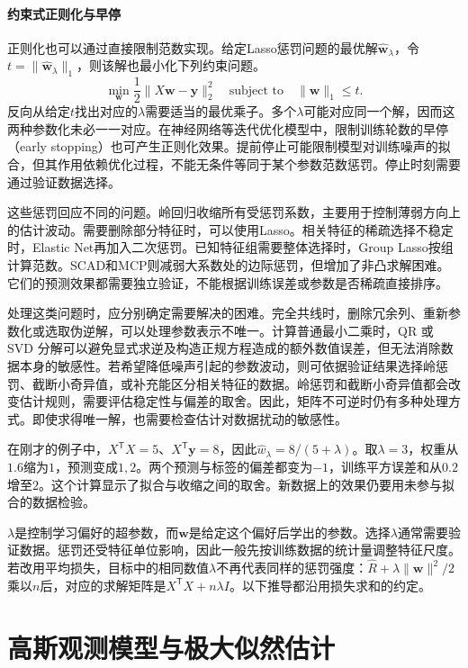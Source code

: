 \paragraph{约束式正则化与早停}
正则化也可以通过直接限制范数实现。给定Lasso惩罚问题的最优解$\hat{\bm w}_\lambda$，令$t=\|\hat{\bm w}_\lambda\|_1$，则该解也最小化下列约束问题。
\begin{equation}
 \min_{\bm w}\frac12\|X\bm w-\bm y\|_2^2
 \quad\text{subject to}\quad \|\bm w\|_1\leq t.
 \end{equation}
 反向从给定$t$找出对应的$\lambda$需要适当的最优乘子。多个$\lambda$可能对应同一个解，因而这两种参数化未必一一对应。在神经网络等迭代优化模型中，限制训练轮数的早停（early stopping）也可产生正则化效果。提前停止可能限制模型对训练噪声的拟合，但其作用依赖优化过程，不能无条件等同于某个参数范数惩罚。停止时刻需要通过验证数据选择。

这些惩罚回应不同的问题。岭回归收缩所有受惩罚系数，主要用于控制薄弱方向上的估计波动。需要删除部分特征时，可以使用Lasso。相关特征的稀疏选择不稳定时，Elastic Net再加入二次惩罚。已知特征组需要整体选择时，Group Lasso按组计算范数。SCAD和MCP则减弱大系数处的边际惩罚，但增加了非凸求解困难。它们的预测效果都需要独立验证，不能根据训练误差或参数是否稀疏直接排序。

处理这类问题时，应分别确定需要解决的困难。完全共线时，删除冗余列、重新参数化或选取伪逆解，可以处理参数表示不唯一。计算普通最小二乘时，QR 或 SVD 分解可以避免显式求逆及构造正规方程造成的额外数值误差，但无法消除数据本身的敏感性。若希望降低噪声引起的参数波动，则可依据验证结果选择岭惩罚、截断小奇异值，或补充能区分相关特征的数据。岭惩罚和截断小奇异值都会改变估计规则，需要评估稳定性与偏差的取舍。因此，矩阵不可逆时仍有多种处理方式。即使求得唯一解，也需要检查估计对数据扰动的敏感性。

在刚才的例子中，$X^{\mathsf T}X=5$、$X^{\mathsf T}\bm y=8$，因此$\hat w_\lambda=8/(5+\lambda)$。取$\lambda=3$，权重从$1.6$缩为$1$，预测变成$1,2$。两个预测与标签的偏差都变为$-1$，训练平方误差和从$0.2$增至$2$。这个计算显示了拟合与收缩之间的取舍。新数据上的效果仍要用未参与拟合的数据检验。

$\lambda$是控制学习偏好的超参数，而$\bm w$是给定这个偏好后学出的参数。选择$\lambda$通常需要验证数据。惩罚还受特征单位影响，因此一般先按训练数据的统计量调整特征尺度。若改用平均损失，目标中的相同数值$\lambda$不再代表同样的惩罚强度：$\hat R+\lambda\|\bm w\|^2/2$乘以$n$后，对应的求解矩阵是$X^{\mathsf T}X+n\lambda I$。以下推导都沿用损失求和的约定。



\section{高斯观测模型与极大似然估计}
